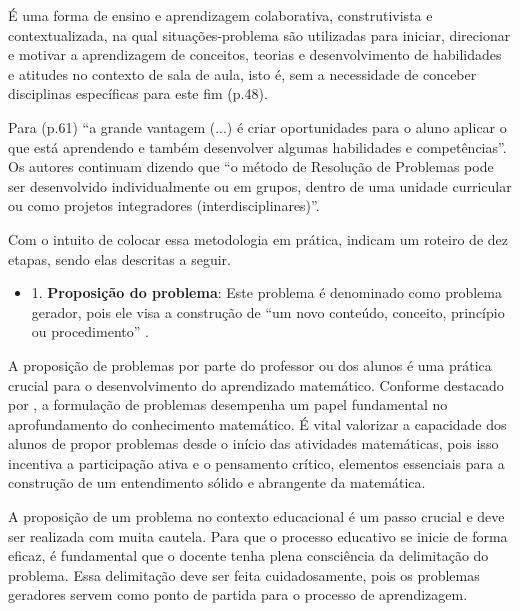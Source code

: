 \begin{citacao}
    É uma forma de ensino e aprendizagem colaborativa, construtivista e contextualizada, na qual situações-problema são utilizadas para iniciar, direcionar e motivar a aprendizagem de conceitos, teorias e desenvolvimento de habilidades e atitudes no contexto de sala de aula, isto é, sem a necessidade de conceber disciplinas específicas para este fim \cite{SOUZA2016} (p.48).
\end{citacao}

Para  (p.61) ``a grande vantagem (...) é criar oportunidades para o aluno aplicar o que está aprendendo e também desenvolver algumas habilidades e competências''. Os autores continuam dizendo que ``o método de Resolução de Problemas pode ser desenvolvido individualmente ou em grupos, dentro de uma unidade curricular ou como projetos integradores (interdisciplinares)''.

Com o intuito de colocar essa metodologia em prática,  indicam um roteiro de dez etapas, sendo elas descritas a seguir.


\begin{itemize}
    \item 1. \textbf{Proposição do problema}: Este problema é denominado como problema gerador, pois ele visa a construção de ``um novo conteúdo, conceito, princípio ou procedimento'' \cite{resolucaoDeProblemas2019}.
\end{itemize}

A proposição de problemas por parte do professor ou dos alunos é uma prática crucial para o desenvolvimento do aprendizado matemático. Conforme destacado por \cite{CAI-etal2015}, a formulação de problemas desempenha um papel fundamental no aprofundamento do conhecimento matemático. É vital valorizar a capacidade dos alunos de propor problemas desde o início das atividades matemáticas, pois isso incentiva a participação ativa e o pensamento crítico, elementos essenciais para a construção de um entendimento sólido e abrangente da matemática.

A proposição de um problema no contexto educacional é um passo crucial e deve ser realizada com muita cautela. Para que o processo educativo se inicie de forma eficaz, é fundamental que o docente tenha plena consciência da delimitação do problema. Essa delimitação deve ser feita cuidadosamente, pois os problemas geradores servem como ponto de partida para o processo de aprendizagem.

